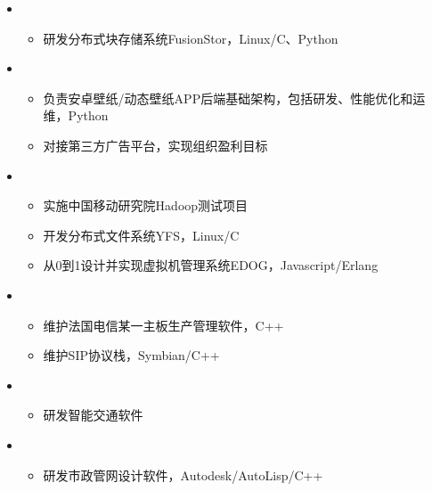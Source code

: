 \begin{itemize}[leftmargin=*]
    \item 
        {\small
        \begin{itemize}
            \item 研发分布式块存储系统FusionStor，Linux/C、Python
        \end{itemize}
        }
    \item
        {\small
        \begin{itemize}
            \item 负责安卓壁纸/动态壁纸APP后端基础架构，包括研发、性能优化和运维，Python
            \item 对接第三方广告平台，实现组织盈利目标
        \end{itemize}
        }
    \item
        {\small
        \begin{itemize}
            \item 实施中国移动研究院Hadoop测试项目
            \item 开发分布式文件系统YFS，Linux/C
            \item 从0到1设计并实现虚拟机管理系统EDOG，Javascript/Erlang
        \end{itemize}
        }
    \item 
        {\small
        \begin{itemize}
            \item 维护法国电信某一主板生产管理软件，C++
            \item 维护SIP协议栈，Symbian/C++
        \end{itemize}
        }
    \item 
        {\small
        \begin{itemize}
            \item 研发智能交通软件
        \end{itemize}
        }
    \item 
        {\small
        \begin{itemize}
            \item 研发市政管网设计软件，Autodesk/AutoLisp/C++
        \end{itemize}
        }
\end{itemize}
